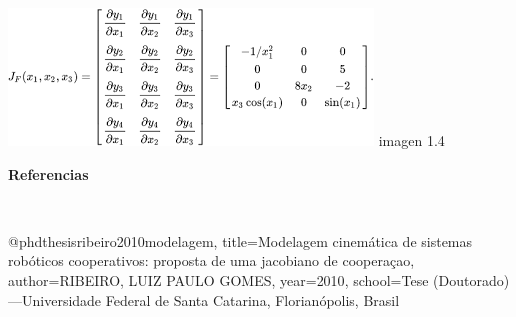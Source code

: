 \documentclass[10pt,a4paper]{article}
\begin{document}
\begin{center}
\includegraphics[scale=1.4]{imagenes/intervalo.png} imagen 1.4
\end{center}
\begin{Huge}
 \textbf{Referencias}
\end{Huge}
\\\begin{large}
 @phdthesis{ribeiro2010modelagem,
  title={Modelagem cinem{\'a}tica de sistemas rob{\'o}ticos cooperativos: proposta de uma jacobiano de coopera{\c{c}}ao},
  author={RIBEIRO, LUIZ PAULO GOMES},
  year={2010},
  school={Tese (Doutorado)—Universidade Federal de Santa Catarina, Florian{\'o}polis, Brasil}
}
\end{large}
\end{document}
